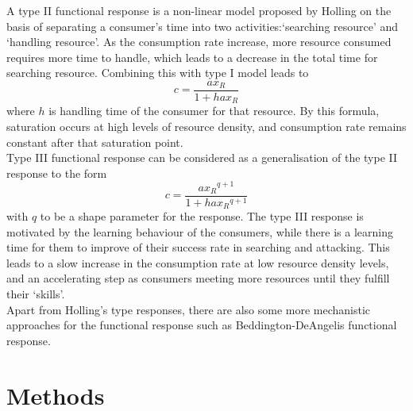 \documentclass{article}[11pt,a4,twosided,doublespacing,titlepagenumber=on,numbers=endperiod]
\begin{document}
\noindent
A type II functional response is a non-linear model proposed by Holling on the basis of separating a consumer's time into two activities:`searching resource' and `handling resource'\cite{dawes2013derivation}. As the consumption rate increase, more resource consumed requires more time to handle, which leads to a decrease in the total time for searching resource. Combining this with type I model leads to 
\begin{equation}
    c = \frac{a x_R}{1+ h a x_R}
\end{equation}
where $h$ is handling time of the consumer for that resource. By this formula, saturation occurs at high levels of resource density, and consumption rate remains constant after that saturation point.\\
\noindent
Type III functional response can be considered as a generalisation of the type II response to the form 
\begin{equation}
    c = \frac{a {x_R}^{q+1}}{1 + h a {x_R}^{q+1}}
\end{equation}
with $q$ to be a shape parameter for the response. The type III response is motivated by the learning behaviour of the consumers, while there is a learning time for them to improve of their success rate in searching and attacking. This leads to a slow increase in the consumption rate at low resource density levels, and an accelerating step as consumers meeting more resources until they fulfill their `skills'.\\
\noindent
Apart from Holling's type responses, there are also some more mechanistic approaches for the functional response such as Beddington-DeAngelis functional response\cite{cantrell2001dynamics}\cite{geritz2012mechanistic}.


\section{Methods}
\end{document}
